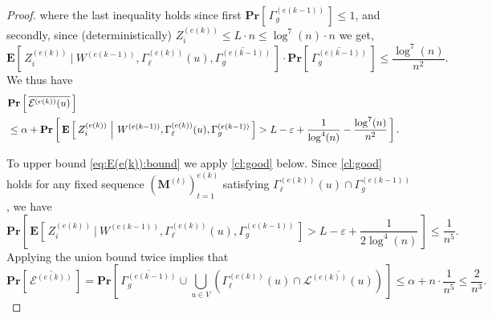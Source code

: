 \documentclass[twoside,leqno]{article}
\newcommand*{\cE}{\mathcal{E}}
\newcommand*{\cL}{\mathcal{L}}
\newcommand{\Pro}[1]{\mathbf{Pr} \left[\,#1\,\right]}
\newcommand{\Ex}[1]{\mathbf{E} \left[\,#1\,\right]}
\newcommand{\Exco}[2]{\mathbf{E} \left[\,#1~\middle\vert~#2\,\right]}
\newcommand{\M}{\mathbf{M}}
\DeclareMathOperator{\1}{\mathbf{1}}
\numberwithin{equation}{section}
\let\epsilon\varepsilon
\newcommand{\newL}{L}
\begin{document}
\begin{proof}
\noindent
where the last inequality holds since first $\Pro{\Gamma_{g}^{(e(k-1))}} \leq 1$,
and secondly, since (deterministically) $Z_i^{(e(k))}\le \newL \cdot n \leq \log^7(n) \cdot n$ we get,
\[
  \Ex{ Z_i^{(e(k))}~\Big|~W^{(e(k-1))},\Gamma_{\ell}^{(e(k))}(u) , \overline{\Gamma_{g}^{(e(k-1))}}}\cdot  \Pro{\overline{\Gamma_{g}^{(e(k-1))}}} \le  \frac{\log^7 (n)}{n^2}.
\]
We thus have
\begin{align}
\lefteqn{ 
\Pro{\overline{\cE^{(e(k))}(u)} } } \notag \\
&\leq
\alpha + \Pro{ 
\Exco{ Z_i^{(e(k))}}{W^{(e(k-1))},\Gamma_{\ell}^{(e(k))}(u), \Gamma_{g}^{(e(k-1))}} > \newL -\epsilon + \frac{1}{\log^4(n)} - \frac{\log^7 (n)}{n^2}}. \label{eq:E(e(k)):bound}
\end{align}

To upper bound \cref{eq:E(e(k)):bound} we apply  \cref{cl:good} below. 
Since \cref{cl:good} holds for any fixed sequence
$\left(\M^{(t)}\right)_{t=1}^{e(k)}$ satisfying $\Gamma_{\ell}^{(e(k))}(u) \cap \Gamma_{g}^{(e(k-1))}$, we have
\[
\Pro{\Ex{ Z_i^{(e(k))}~\Big|~W^{(e(k-1))},\Gamma_{\ell}^{(e(k))}(u),\Gamma_g^{(e(k-1))} } > \newL -\epsilon + \frac{1}{2\log^4(n)} } \le \frac{1}{n^5}.
\]
Applying the union bound twice
implies that 
\[
\Pro{\overline{\mathcal{E}^{(e(k))}}} = 
\Pro{ \overline{\Gamma_g^{(e(k-1))}} \cup \bigcup_{u \in V} \left(\Gamma_{\ell}^{(e(k))}(u) \cap \overline{\cL^{(e(k))}(u)} \right) } \leq \alpha + n \cdot \frac{1}{n^5} \leq
\frac{2}{n^3}.
\]
\end{proof}
\end{document}
